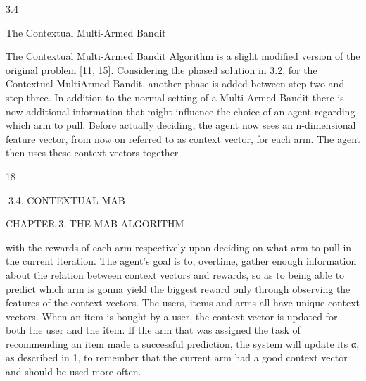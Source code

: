 3.4

The Contextual Multi-Armed Bandit

The Contextual Multi-Armed Bandit Algorithm is a slight modified version of the original problem [11, 15]. Considering the phased solution in 3.2, for the Contextual MultiArmed Bandit, another phase is added between step two and step three. In addition to
the normal setting of a Multi-Armed Bandit there is now additional information that
might influence the choice of an agent regarding which arm to pull. Before actually
deciding, the agent now sees an n-dimensional feature vector, from now on referred to
as context vector, for each arm. The agent then uses these context vectors together

18

3.4. CONTEXTUAL MAB

CHAPTER 3. THE MAB ALGORITHM

with the rewards of each arm respectively upon deciding on what arm to pull in the
current iteration. The agent’s goal is to, overtime, gather enough information about the
relation between context vectors and rewards, so as to being able to predict which arm is
gonna yield the biggest reward only through observing the features of the context vectors.
The users, items and arms all have unique context vectors. When an item is bought
by a user, the context vector is updated for both the user and the item. If the arm
that was assigned the task of recommending an item made a successful prediction, the
system will update its α, as described in 1, to remember that the current arm had a good context vector and should be used more often.

